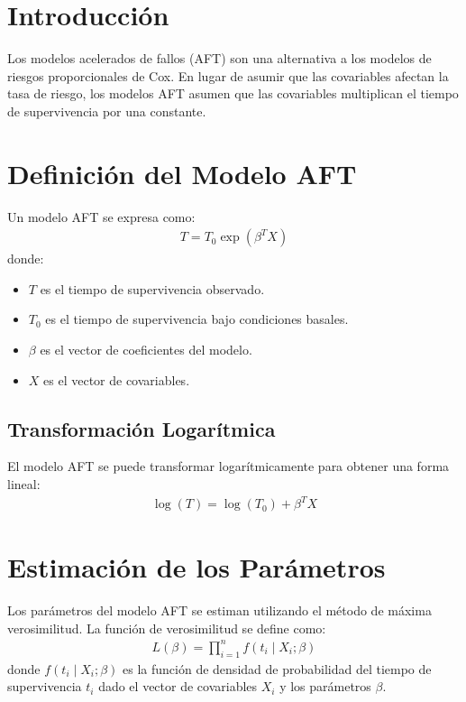 \documentclass[a4paper]{report} %
\begin{document}
\section{Introducci\'on}
Los modelos acelerados de fallos (AFT) son una alternativa a los modelos de riesgos proporcionales de Cox. En lugar de asumir que las covariables afectan la tasa de riesgo, los modelos AFT asumen que las covariables multiplican el tiempo de supervivencia por una constante.

\section{Definici\'on del Modelo AFT}
Un modelo AFT se expresa como:
\begin{eqnarray*}
T = T_0 \exp(\beta^T X)
\end{eqnarray*}
donde:
\begin{itemize}
    \item $T$ es el tiempo de supervivencia observado.
    \item $T_0$ es el tiempo de supervivencia bajo condiciones basales.
    \item $\beta$ es el vector de coeficientes del modelo.
    \item $X$ es el vector de covariables.
\end{itemize}

\subsection{Transformaci\'on Logar\'itmica}
El modelo AFT se puede transformar logar\'itmicamente para obtener una forma lineal:
\begin{eqnarray*}
\log(T) = \log(T_0) + \beta^T X
\end{eqnarray*}

\section{Estimaci\'on de los Parámetros}
Los parámetros del modelo AFT se estiman utilizando el m\'etodo de máxima verosimilitud. La funci\'on de verosimilitud se define como:
\begin{eqnarray*}
L(\beta) = \prod_{i=1}^n f(t_i \mid X_i; \beta)
\end{eqnarray*}
donde $f(t_i \mid X_i; \beta)$ es la funci\'on de densidad de probabilidad del tiempo de supervivencia $t_i$ dado el vector de covariables $X_i$ y los par\'ametros $\beta$.
\end{document}
